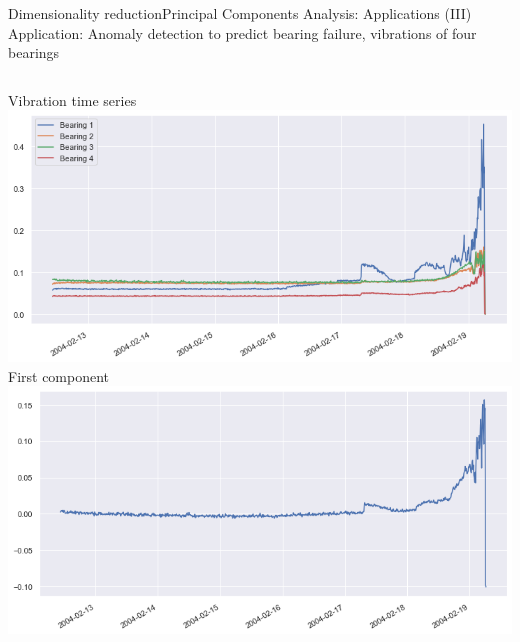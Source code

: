\documentclass[10pt,compress]{beamer} %
\begin{document}
\begin{frame}{Dimensionality reduction}{Principal Components Analysis: Applications (III)}
	Application: Anomaly detection to predict bearing failure, vibrations of four bearings

    \smallskip

    \begin{columns}
            \centering Vibration time series
			\includegraphics[width=\linewidth]{figs/bearings1.png}
            \centering First component
			\includegraphics[width=\linewidth]{figs/bearingspca.png}
    \end{columns}


\end{frame}
\end{document}
